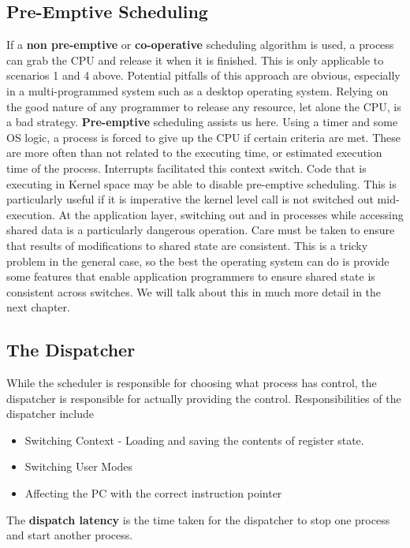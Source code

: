 \documentclass[10pt,a4paper]{article}
\begin{document}
\subsection{Pre-Emptive Scheduling}
If a {\bf non pre-emptive} or {\bf co-operative} scheduling algorithm is used, a process can grab the CPU and release it when it is finished. This is only applicable to scenarios 1 and 4 above. Potential pitfalls of this approach are obvious, especially in a multi-programmed system such as a desktop operating system. Relying on the good nature of any programmer to release any resource, let alone the CPU, is a bad strategy. {\bf Pre-emptive} scheduling assists us here. Using a timer and some OS logic, a process is forced to give up the CPU if certain criteria are met. These are more often than not related to the executing time, or estimated execution time of the process. Interrupts facilitated this context switch. Code that is executing in Kernel space may be able to disable pre-emptive scheduling. This is particularly useful if it is imperative the kernel level call is not switched out mid-execution. 
\newline\newline
At the application layer, switching out and in processes while accessing shared data is a particularly dangerous operation. Care must be taken to ensure that results of modifications to shared state are consistent. This is a tricky problem in the general case, so the best the operating system can do is provide some features that enable application programmers to ensure shared state is consistent across switches. We will talk about this in much more detail in the next chapter. 
\subsection{The Dispatcher}
While the scheduler is responsible for choosing what process has control, the dispatcher is responsible for actually providing the control. Responsibilities of the dispatcher include 
\begin{itemize}
\item Switching Context - Loading and saving the contents of register state. 
\item Switching User Modes 
\item Affecting the PC with the correct instruction pointer
\end{itemize}
The {\bf dispatch latency} is the time taken for the dispatcher to stop one process and start another process. 
\end{document}
